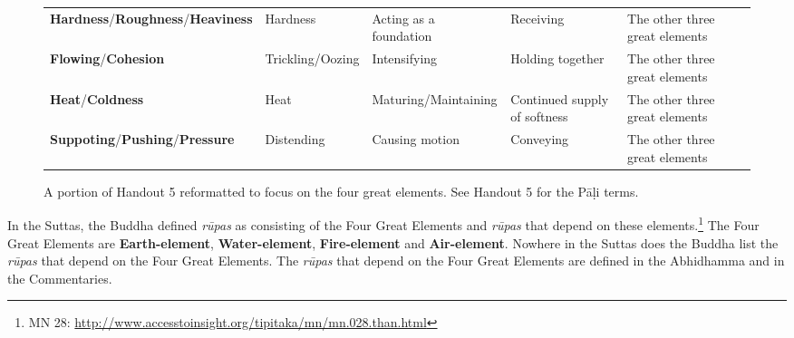\begin{figure} [H]

\setlength{\tabcolsep}{0pt}
\renewcommand{\arraystretch}{1.1}

\noindent\begin{tabular}{P{0.25\textwidth} | C{.185\textwidth} C{0.185\textwidth} C{0.185\textwidth} C{0.195\textwidth} m{0mm}}
\toprule
 &  &  &  & \\
\midrule
\textbf{Hardness}/\newline \textbf{Roughness}/\newline \textbf{Heaviness} & Hardness & Acting as a foundation & Receiving & The other three great elements &\\[9mm]
\textbf{Flowing}/\newline \textbf{Cohesion} & Trickling/\newline Oozing & Intensifying & Holding together & The other three great elements &\\[9mm]
\textbf{Heat}/\newline \textbf{Coldness} & Heat & Maturing/\newline Maintaining & Continued supply of softness & The other three great elements &\\[9mm]
\textbf{Suppoting}/\newline \textbf{Pushing}/\newline \textbf{Pressure} & Distending & Causing motion & Conveying & The other three great elements &\\[9mm]
\bottomrule
\end{tabular} 

\caption{A portion of Handout 5 reformatted to focus on the four great elements. See Handout 5 for the Pāḷi terms.}

\end{figure}

In the Suttas, the Buddha defined \textit{rūpas} as consisting of the Four Great Elements and \textit{rūpas} that depend on these elements.\footnote{MN 28: \url{http://www.accesstoinsight.org/tipitaka/mn/mn.028.than.html}} The Four Great Elements are \textbf{Earth-element}, \textbf{Water-element}, \textbf{Fire-element} and \textbf{Air-element}. Nowhere in the Suttas does the Buddha list the \textit{rūpas} that depend on the Four Great Elements. The \textit{rūpas} that depend on the Four Great Elements are defined in the Abhidhamma and in the Commentaries.

